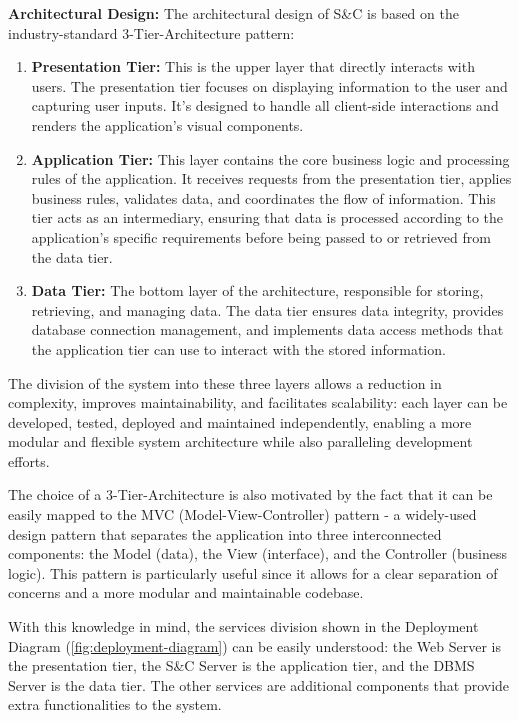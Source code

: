 \par{\textbf{Architectural Design:}} The architectural design of S\&C is based on the industry-standard 3-Tier-Architecture pattern:

\begin{enumerate}
      \item \textbf{Presentation Tier:} This is the upper layer that directly interacts with users. The presentation tier
            focuses on displaying information to the user and capturing user inputs. It's designed to handle all client-side
            interactions and renders the application's visual components.
      \item \textbf{Application Tier:} This layer contains the core business logic and processing rules of the
            application. It receives requests from the presentation tier, applies business rules, validates data, and
            coordinates the flow of information. This tier acts as an intermediary, ensuring that data is processed
            according to the application's specific requirements before being passed to or retrieved from the data tier.
      \item \textbf{Data Tier:} The bottom layer of the architecture, responsible for storing, retrieving, and managing
            data. The data tier ensures data integrity, provides database connection management, and implements data
            access methods that the application tier can use to interact with the stored information.
\end{enumerate}

The division of the system into these three layers allows a reduction in complexity, improves maintainability, and
facilitates scalability: each layer can be developed, tested, deployed and maintained independently, enabling a more
modular and flexible system architecture while also paralleling development efforts.

The choice of a 3-Tier-Architecture is also motivated by the fact that it can be easily mapped to the MVC
(Model-View-Controller) pattern - a widely-used design pattern that separates the application into three interconnected
components: the Model (data), the View (interface), and the Controller (business logic). This pattern is particularly
useful since it allows for a clear separation of concerns and a more modular and maintainable codebase.

With this knowledge in mind, the services division shown in the Deployment Diagram (\ref{fig:deployment-diagram}) can
be easily understood: the Web Server is the presentation tier, the S\&C Server is the application tier, and the DBMS
Server is the data tier. The other services are additional components that provide extra functionalities to the system.

